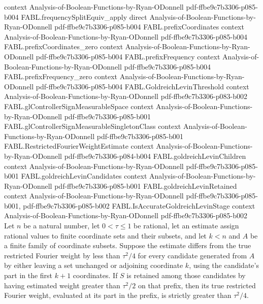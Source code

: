 \begin{theorem}
  {context}
  {Analysis-of-Boolean-Functions-by-Ryan-ODonnell}
  {pdf-ffbe9c7b3306-p085-b004}
\proofstep
  {FABL.frequencySplitEquiv_apply}
  {direct}
  {Analysis-of-Boolean-Functions-by-Ryan-ODonnell}
  {pdf-ffbe9c7b3306-p085-b004}
\proofstep
  {FABL.prefixCoordinates}
  {context}
  {Analysis-of-Boolean-Functions-by-Ryan-ODonnell}
  {pdf-ffbe9c7b3306-p085-b004}
\proofstep
  {FABL.prefixCoordinates_zero}
  {context}
  {Analysis-of-Boolean-Functions-by-Ryan-ODonnell}
  {pdf-ffbe9c7b3306-p085-b004}
\proofstep
  {FABL.prefixFrequency}
  {context}
  {Analysis-of-Boolean-Functions-by-Ryan-ODonnell}
  {pdf-ffbe9c7b3306-p085-b004}
\proofstep
  {FABL.prefixFrequency_zero}
  {context}
  {Analysis-of-Boolean-Functions-by-Ryan-ODonnell}
  {pdf-ffbe9c7b3306-p085-b004}
\proofstep
  {FABL.GoldreichLevinThreshold}
  {context}
  {Analysis-of-Boolean-Functions-by-Ryan-ODonnell}
  {pdf-ffbe9c7b3306-p083-b002}
\proofstep
  {FABL.glControllerSignMeasurableSpace}
  {context}
  {Analysis-of-Boolean-Functions-by-Ryan-ODonnell}
  {pdf-ffbe9c7b3306-p085-b001}
\proofstep
  {FABL.glControllerSignMeasurableSingletonClass}
  {context}
  {Analysis-of-Boolean-Functions-by-Ryan-ODonnell}
  {pdf-ffbe9c7b3306-p085-b001}
\proofstep
  {FABL.RestrictedFourierWeightEstimate}
  {context}
  {Analysis-of-Boolean-Functions-by-Ryan-ODonnell}
  {pdf-ffbe9c7b3306-p084-b004}
\proofstep
  {FABL.goldreichLevinChildren}
  {context}
  {Analysis-of-Boolean-Functions-by-Ryan-ODonnell}
  {pdf-ffbe9c7b3306-p085-b001}
\proofstep
  {FABL.goldreichLevinCandidates}
  {context}
  {Analysis-of-Boolean-Functions-by-Ryan-ODonnell}
  {pdf-ffbe9c7b3306-p085-b001}
\proofstep
  {FABL.goldreichLevinRetained}
  {context}
  {Analysis-of-Boolean-Functions-by-Ryan-ODonnell}
  {pdf-ffbe9c7b3306-p085-b001,
    pdf-ffbe9c7b3306-p085-b002}
\proofstep
  {FABL.IsAccurateGoldreichLevinStage}
  {context}
  {Analysis-of-Boolean-Functions-by-Ryan-ODonnell}
  {pdf-ffbe9c7b3306-p085-b002}
Let $n$ be a natural number, let $0<\tau\leq 1$ be rational, let an estimate assign
rational values to finite coordinate sets and their subsets, and let $k<n$ and $A$ be a
finite family of coordinate subsets. Suppose the estimate differs from the true
restricted Fourier weight by less than $\tau^2/4$ for every candidate generated from $A$
by either leaving a set unchanged or adjoining coordinate $k$, using the candidate's
part in the first $k+1$ coordinates. If $S$ is retained among those candidates by having
estimated weight greater than $\tau^2/2$ on that prefix, then its true restricted
Fourier weight, evaluated at its part in the prefix, is strictly greater than
$\tau^2/4$.
\end{theorem}

